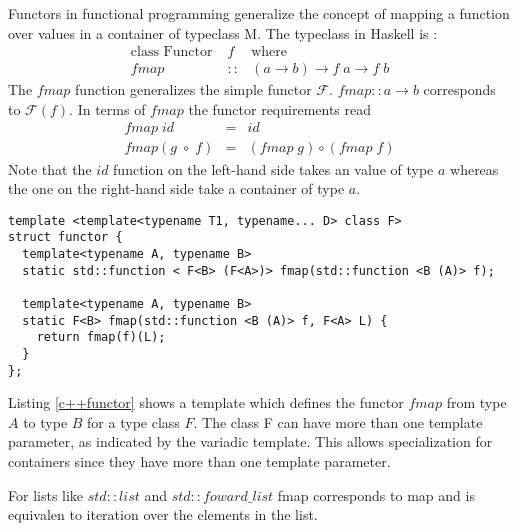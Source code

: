 \documentclass[12pt,fleqn]{article}
\begin{document}

Functors in functional programming generalize the concept of mapping a function over values in a container of typeclass M.
The typeclass in Haskell is :
\begin{eqnarray*}
\mbox{class Functor}\; &f& \mbox{where} \\
fmap &::& (a \rightarrow b) \rightarrow f\;a \rightarrow f\;b
\end{eqnarray*}
The $fmap$ function generalizes the simple functor $\mathcal{F}$. 
$fmap::a \rightarrow b$ corresponds to $\mathcal{F}(f)$.
In terms of $fmap$ the functor requirements read 
\begin{eqnarray*}
fmap \; id &=& id  \\
fmap (g \; \circ \; f) &=& (fmap \;g) \circ (fmap \;f) 
\end{eqnarray*}
Note that the $id$ function on the left-hand side takes an value of type $a$ whereas the one on the right-hand side take a container of type $a$.

\begin{lstlisting}[caption=functor in C++, label=c++functor]
template <template<typename T1, typename... D> class F>
struct functor {
  template<typename A, typename B>
  static std::function < F<B> (F<A>)> fmap(std::function <B (A)> f);

  template<typename A, typename B>
  static F<B> fmap(std::function <B (A)> f, F<A> L) {
    return fmap(f)(L);
  }
};
\end{lstlisting}
Listing \ref{c++functor} shows a template which defines the functor $fmap$ from type $A$ to type $B$ for a type class $F$. 
The class F can have more than one template parameter, as indicated by the variadic template.
This allows specialization for containers since they have more than one template parameter.

For lists like $std::list$ and $std::foward\_list$ fmap corresponds to map and is equivalen to iteration over the elements in the list.

\begin{comment}
\begin{lstlisting}[caption=fmap for , label=listing_fmap ]
template <template<typename T1, typename... D> class F>
struct functor {

  //curried version
  template<typename A, typename B>
  static std::function < F<B> (F<A>)> fmap(std::function <B (A)> f);

  // uncurried, for functions..
  template<typename A, typename B>
  static F<B> fmap(std::function <B (A)> f, F<A> L) {
    return fmap(f)(L);
  }
};
\end{lstlisting}
\end{comment}
\end{document}
